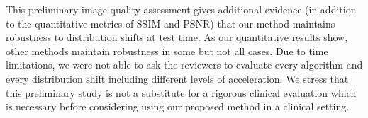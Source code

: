 \documentclass{article}
\begin{document}
This preliminary image quality assessment gives additional evidence
(in addition to the quantitative metrics of SSIM and PSNR) that our
method maintains robustness to distribution shifts at test time. As
our quantitative results show, other methods maintain robustness in
some but not all cases. Due to time limitations, we were not able to
ask the reviewers to evaluate every algorithm and every distribution
shift including different levels of acceleration. We stress that this
preliminary study is not a substitute for a rigorous clinical
evaluation which is necessary before considering using our proposed
method in a clinical setting.
\end{document}
